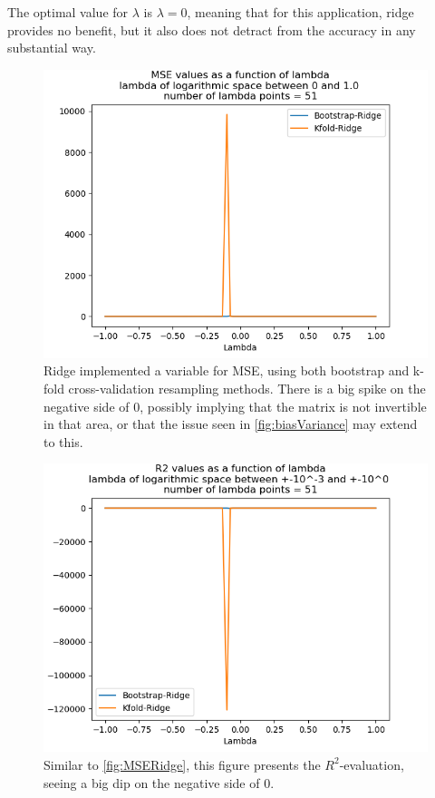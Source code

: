 \documentclass[a4paper, UKenglish]{article}
\newcommand{\0}{\mathbf{0}}
\newcommand{\1}{\mathbf{1}}
\begin{document}
The optimal value for $\lambda$ is $\lambda = 0$, meaning that for this application, ridge provides no benefit, but it also does not detract from the accuracy in any substantial way.

\begin{figure}[H]
        \centering 
        \includegraphics[scale=0.75]{../outputs/images/partD/MSERidge.png} 
        \caption{Ridge implemented a variable for MSE, using both bootstrap and k-fold cross-validation resampling methods. There is a big spike on the negative side of 0, possibly implying that the matrix is not invertible in that area, or that the issue seen in \autoref{fig:biasVariance} may extend to this.}
        \label{fig:MSERidge}
\end{figure}
\begin{figure}[H]
        \centering 
        \includegraphics[scale=0.75]{../outputs/images/partD/R2Ridge.png} 
        \caption{Similar to \autoref{fig:MSERidge}, this figure presents the $R^2$-evaluation, seeing a big dip on the negative side of 0.}
        \label{fig:R2Ridge}
\end{figure}
\end{document}
